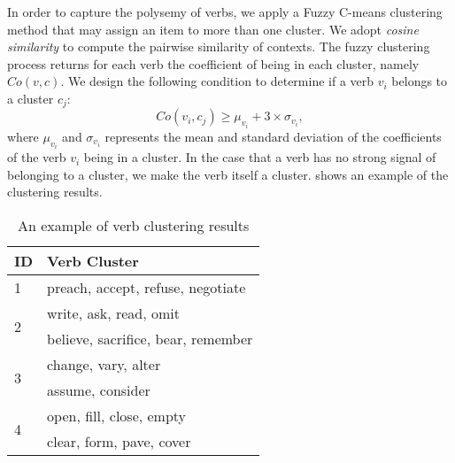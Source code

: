 In order to capture the polysemy of verbs, we apply
a Fuzzy C-means clustering method\cite{dunn73:fuzzycmeans}
that may assign an item
to more than one cluster. We adopt \emph{cosine similarity}
to compute the pairwise similarity of contexts.
The fuzzy clustering process returns for each verb the coefficient
of being in each cluster, namely $Co(v,c)$.
We design
the following condition to determine if a verb $v_i$
belongs to a cluster $c_j$:
$$
Co(v_i,c_j) \geq \mu_{v_i} + 3 \times \sigma_{v_i},
$$
where $\mu_{v_i}$ and $\sigma_{v_i}$ represents the mean and
standard deviation of the coefficients of the verb $v_i$
being in a cluster.
In the case that a verb has no strong signal of
belonging to a cluster, we make the verb itself a cluster.
 shows an example of the clustering results.
\begin{table}[th]
\center
\scriptsize
\caption{An example of verb clustering results}
\begin{tabular}{|l|l|}
\hline
ID  &   Verb Cluster \\
\hline \hline
1   &   preach, accept, refuse, negotiate\\
\hline
\multirow{2}{*}{2}
    &   write, ask, read, omit\\
    &   believe, sacrifice, bear, remember\\
\hline
\multirow{2}{*}{3}
    &   change, vary, alter\\
    &   assume, consider\\
\hline
\multirow{2}{*}{4}
    &   open, fill, close, empty \\
    &   clear, form, pave, cover \\
\hline
\end{tabular}
\label{tab:cluster}
\end{table}


